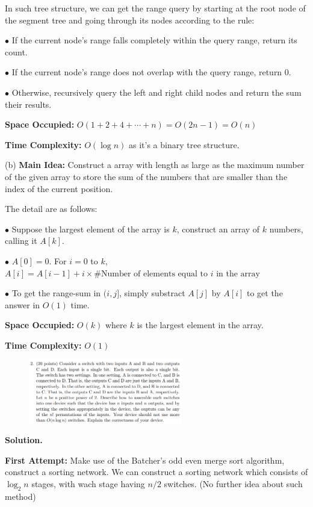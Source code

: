 \documentclass[10pt]{article}
\begin{document}
In such tree structure, we can get the range query by starting at the root node of the segment tree and going through its nodes according to the rule:

$\bullet$ If the current node's range falls completely within the query range, return its count.

$\bullet$ If the current node's range does not overlap with the query range, return 0.

$\bullet$ Otherwise, recursively query the left and right child nodes and return the sum their results.

\textbf{Space Occupied:} $O(1+2+4+\cdots+n) = O(2n-1) = O(n)$

\textbf{Time Complexity:} $O(\log n)$ as it's a binary tree structure.

(b) \textbf{Main Idea:} Construct a array with length as large as the maximum number of the given array to store the sum of the numbers that are smaller than the index of the current position.

The detail are as follows:

$\bullet$ Suppose the largest element of the array is $k$, construct an array of $k$ numbers, calling it $A[k]$.

$\bullet$ $A[0] = 0$. For $i = 0$ to $k$, $A[i] = A[i-1] + i \times \#\text{Number of elements equal to $i$ in the array}$

$\bullet$ To get the range-sum in $(i, j]$, simply substract $A[j]$ by $A[i]$ to get the answer in $O(1)$ time.

\textbf{Space Occupied:} $O(k)$ where $k$ is the largest element in the array.

\textbf{Time Complexity:} $O(1)$

\newpage

\begin{figure}[h]
	\centering
	\includegraphics[width=0.6\textwidth]{hw2-2}
\end{figure}

\textbf{Solution.}

\textbf{First Attempt:} Make use of the Batcher's odd even merge sort algorithm, construct a sorting network. We can construct a sorting network which consists of $\log_2 n$ stages, with wach stage having $n/2$ switches. (No further idea about such method)
\end{document}
